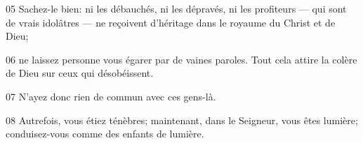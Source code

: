 
05 Sachez-le bien: ni les débauchés, ni les dépravés, ni les profiteurs --- qui sont de vrais idolâtres --- ne reçoivent d’héritage dans le royaume du Christ et de Dieu;

06 ne laissez personne vous égarer par de vaines paroles. Tout cela attire la colère de Dieu sur ceux qui désobéissent.

07 N’ayez donc rien de commun avec ces gens-là.

08 Autrefois, vous étiez ténèbres; maintenant, dans le Seigneur, vous êtes lumière; conduisez-vous comme des enfants de lumière.